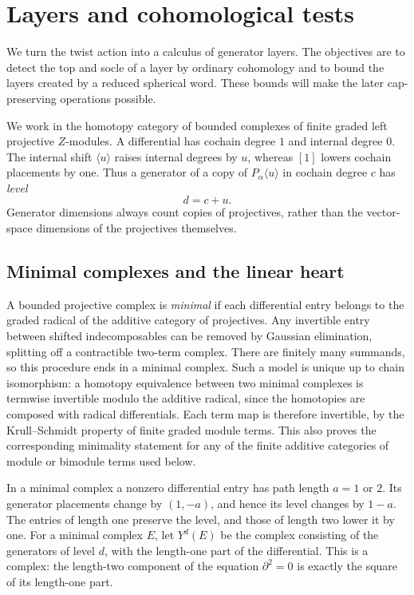 \section{Layers and cohomological tests}
\label{sec:layers}

We turn the twist action into a calculus of generator layers.  The
objectives are to detect the top and socle of a layer by ordinary
cohomology and to bound the layers created by a reduced spherical word.
These bounds will make the later cap-preserving operations possible.

We work in the homotopy category of bounded complexes of finite graded
left projective $Z$-modules.  A differential has cochain degree $1$ and
internal degree $0$.  The internal shift $\langle u\rangle$ raises
internal degrees by $u$, whereas $[1]$ lowers cochain placements by one.
Thus a generator of a copy of $P_\alpha\langle u\rangle$ in cochain
degree $c$ has \emph{level}
\begin{equation}
 d=c+u.
 \label{eq:layers-level}
\end{equation}
Generator dimensions always count copies of projectives, rather than
the vector-space dimensions of the projectives themselves.

\subsection{Minimal complexes and the linear heart}

A bounded projective complex is \emph{minimal} if each differential
entry belongs to the graded radical of the additive category of
projectives.  Any invertible entry between shifted indecomposables can
be removed by Gaussian elimination, splitting off a contractible
two-term complex.  There are finitely many summands, so this procedure
ends in a minimal complex.  Such a model is unique up to chain
isomorphism: a homotopy equivalence between two minimal complexes is
termwise invertible modulo the additive radical, since the homotopies
are composed with radical differentials.  Each term map is therefore
invertible, by the Krull--Schmidt property of finite graded module
terms.  This also proves the corresponding minimality statement for
any of the finite additive categories of module or bimodule terms
used below.

In a minimal complex a nonzero differential entry has path length
$a=1$ or $2$.  Its generator placements change by $(1,-a)$, and hence
its level changes by $1-a$.  The entries of length one preserve the
level, and those of length two lower it by one.  For a minimal complex
$E$, let $Y^d(E)$ be the complex consisting of the generators of level
$d$, with the length-one part of the differential.  This is a complex:
the length-two component of the equation $\partial^2=0$ is exactly
the square of its length-one part.

